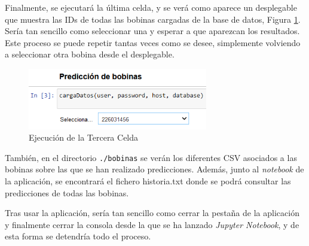 Finalmente, se ejecutará la última celda, y se verá como aparece un desplegable que muestra las IDs de todas las bobinas cargadas de la base de datos, Figura \ref{f:celda3}. Sería tan sencillo como seleccionar una y esperar a que aparezcan los resultados. Este proceso se puede repetir tantas veces como se desee, simplemente volviendo a seleccionar otra bobina desde el desplegable.

\begin{figure}[h]
 \centering
  \includegraphics[width=0.7\textwidth]{img/celda3.PNG}
 \caption{Ejecución de la Tercera Celda}
 \label{f:celda3}
\end{figure}

También, en el directorio \texttt{./bobinas} se verán los diferentes CSV asociados a las bobinas sobre las que se han realizado predicciones. Además, junto al \emph{notebook} de la aplicación, se encontrará el fichero historia.txt donde se podrá consultar las predicciones de todas las bobinas.

Tras usar la aplicación, sería tan sencillo como cerrar la pestaña de la aplicación y finalmente cerrar la consola desde la que se ha lanzado \emph{Jupyter Notebook}, y de esta forma se detendría todo el proceso.